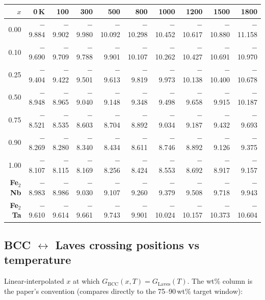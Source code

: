\documentclass[11pt,a4paper]{article}
\begin{document}
\begin{center}
{\scriptsize\setlength{\tabcolsep}{4pt}
\begin{tabular}{rrrrrrrrrr}
\toprule
$x$ & 0\,K & 100 & 300 & 500 & 800 & 1000 & 1200 & 1500 & 1800\\
\midrule
0.00 & $-$9.884 & $-$9.902 & $-$9.980 & $-$10.092 & $-$10.298 & $-$10.452 & $-$10.617 & $-$10.880 & $-$11.158\\
0.10 & $-$9.690 & $-$9.709 & $-$9.788 & $-$9.901  & $-$10.107 & $-$10.262 & $-$10.427 & $-$10.691 & $-$10.970\\
0.25 & $-$9.404 & $-$9.422 & $-$9.501 & $-$9.613  & $-$9.819  & $-$9.973  & $-$10.138 & $-$10.400 & $-$10.678\\
0.50 & $-$8.948 & $-$8.965 & $-$9.040 & $-$9.148  & $-$9.348  & $-$9.498  & $-$9.658  & $-$9.915  & $-$10.187\\
0.75 & $-$8.521 & $-$8.535 & $-$8.603 & $-$8.704  & $-$8.892  & $-$9.034  & $-$9.187  & $-$9.432  & $-$9.693\\
0.90 & $-$8.269 & $-$8.280 & $-$8.340 & $-$8.434  & $-$8.611  & $-$8.746  & $-$8.892  & $-$9.126  & $-$9.375\\
1.00 & $-$8.107 & $-$8.115 & $-$8.169 & $-$8.256  & $-$8.424  & $-$8.553  & $-$8.692  & $-$8.917  & $-$9.157\\
\midrule
\textbf{Fe$_2$Nb} & $-$8.983 & $-$8.986 & $-$9.030 & $-$9.107 & $-$9.260 & $-$9.379 & $-$9.508 & $-$9.718 & $-$9.943\\
\textbf{Fe$_2$Ta} & $-$9.610 & $-$9.614 & $-$9.661 & $-$9.743 & $-$9.901 & $-$10.024 & $-$10.157 & $-$10.373 & $-$10.604\\
\bottomrule
\end{tabular}}
\end{center}

\subsection{BCC $\leftrightarrow$ Laves crossing positions vs temperature}

Linear-interpolated $x$ at which $G_{\text{BCC}}(x,T) = G_{\text{Laves}}(T)$.
The wt\% column is the paper's convention (compares directly to the
75--90\,wt\% target window):
\end{document}
